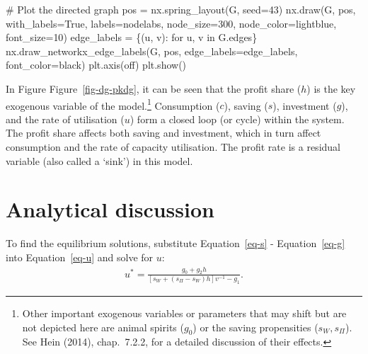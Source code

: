 \documentclass[
  letterpaper,
  DIV=11,
  numbers=noendperiod]{scrreprt}
\newenvironment{Shaded}{\begin{snugshade}}{\end{snugshade}}
\newcommand{\CommentTok}[1]{\textcolor[rgb]{0.37,0.37,0.37}{#1}}
\newcommand{\ControlFlowTok}[1]{\textcolor[rgb]{0.00,0.23,0.31}{#1}}
\newcommand{\DecValTok}[1]{\textcolor[rgb]{0.68,0.00,0.00}{#1}}
\newcommand{\KeywordTok}[1]{\textcolor[rgb]{0.00,0.23,0.31}{#1}}
\newcommand{\NormalTok}[1]{\textcolor[rgb]{0.00,0.23,0.31}{#1}}
\newcommand{\OperatorTok}[1]{\textcolor[rgb]{0.37,0.37,0.37}{#1}}
\newcommand{\StringTok}[1]{\textcolor[rgb]{0.13,0.47,0.30}{#1}}
\newcommand{\VariableTok}[1]{\textcolor[rgb]{0.07,0.07,0.07}{#1}}
\begin{document}
\begin{tcolorbox}
\begin{Shaded}
\begin{Highlighting}[]
\CommentTok{\# Plot the directed graph}
\NormalTok{pos }\OperatorTok{=}\NormalTok{ nx.spring\_layout(G, seed}\OperatorTok{=}\DecValTok{43}\NormalTok{)  }
\NormalTok{nx.draw(G, pos, with\_labels}\OperatorTok{=}\VariableTok{True}\NormalTok{, labels}\OperatorTok{=}\NormalTok{nodelabs, node\_size}\OperatorTok{=}\DecValTok{300}\NormalTok{, node\_color}\OperatorTok{=}\StringTok{\textquotesingle{}lightblue\textquotesingle{}}\NormalTok{, }
\NormalTok{        font\_size}\OperatorTok{=}\DecValTok{10}\NormalTok{)}
\NormalTok{edge\_labels }\OperatorTok{=}\NormalTok{ \{(u, v): }\StringTok{\textquotesingle{}\textquotesingle{}} \ControlFlowTok{for}\NormalTok{ u, v }\KeywordTok{in}\NormalTok{ G.edges\}}
\NormalTok{nx.draw\_networkx\_edge\_labels(G, pos, edge\_labels}\OperatorTok{=}\NormalTok{edge\_labels, font\_color}\OperatorTok{=}\StringTok{\textquotesingle{}black\textquotesingle{}}\NormalTok{)}
\NormalTok{plt.axis(}\StringTok{\textquotesingle{}off\textquotesingle{}}\NormalTok{)}
\NormalTok{plt.show()}
\end{Highlighting}
\end{Shaded}

\end{tcolorbox}

In Figure Figure~\ref{fig-dg-pkdg}, it can be seen that the profit share
(\(h\)) is the key exogenous variable of the model.\footnote{Other
  important exogenous variables or parameters that may shift but are not
  depicted here are animal spirits (\(g_0\)) or the saving propensities
  (\(s_W, s_\Pi\)). See Hein (2014), chap.~7.2.2, for a detailed
  discussion of their effects.} Consumption (\(c\)), saving (\(s\)),
investment (\(g\)), and the rate of utilisation (\(u\)) form a closed
loop (or cycle) within the system. The profit share affects both saving
and investment, which in turn affect consumption and the rate of
capacity utilisation. The profit rate is a residual variable (also
called a `sink') in this model.

\section{Analytical discussion}\label{analytical-discussion-4}

To find the equilibrium solutions, substitute Equation~\ref{eq-s} -
Equation~\ref{eq-g} into Equation~\ref{eq-u} and solve for \(u\):
\begin{align}
u^* = \frac{g_0+g_2h}{[s_W + (s_\Pi - s_W)h]v^{-1}-g_1}.
\end{align}
\end{document}
